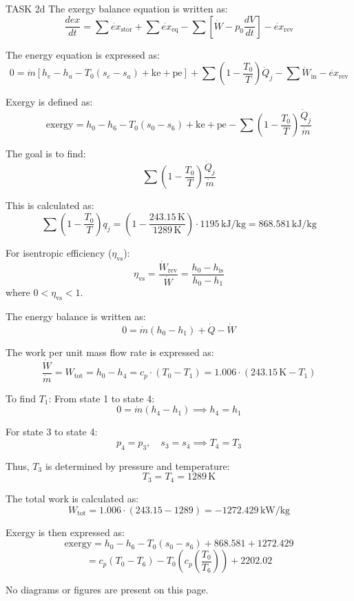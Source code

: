 TASK 2d  
The exergy balance equation is written as:  
\[
\frac{d ex}{dt} = \sum \dot{ex}_{\text{stor}} + \sum \dot{ex}_{\text{eq}} - \sum \left[ \dot{W} - p_0 \frac{dV}{dt} \right] - \dot{ex}_{\text{rev}}
\]  

The energy equation is expressed as:  
\[
0 = \dot{m} \left[ h_e - h_a - T_0 (s_e - s_a) + \text{ke} + \text{pe} \right] + \sum \left( 1 - \frac{T_0}{T} \right) \dot{Q}_j - \sum \dot{W}_{\text{in}} - \dot{ex}_{\text{rev}}
\]  

Exergy is defined as:  
\[
\text{exergy} = h_0 - h_6 - T_0 (s_0 - s_6) + \text{ke} + \text{pe} - \sum \left( 1 - \frac{T_0}{T} \right) \frac{\dot{Q}_j}{\dot{m}}
\]  

The goal is to find:  
\[
\sum \left( 1 - \frac{T_0}{T} \right) \frac{\dot{Q}_j}{\dot{m}}
\]  

This is calculated as:  
\[
\sum \left( 1 - \frac{T_0}{T} \right) q_j = \left( 1 - \frac{243.15 \, \text{K}}{1289 \, \text{K}} \right) \cdot 1195 \, \text{kJ/kg} = 868.581 \, \text{kJ/kg}
\]  

For isentropic efficiency (\( \eta_{\text{vs}} \)):  
\[
\eta_{\text{vs}} = \frac{\dot{W}_{\text{rev}}}{\dot{W}} = \frac{h_0 - h_{\text{is}}}{h_0 - h_1}
\]  
where \( 0 < \eta_{\text{vs}} < 1 \).  

The energy balance is written as:  
\[
0 = \dot{m} (h_0 - h_1) + \dot{Q} - \dot{W}
\]  

The work per unit mass flow rate is expressed as:  
\[
\frac{\dot{W}}{\dot{m}} = W_{\text{tot}} = h_0 - h_4 = c_p \cdot (T_0 - T_1) = 1.006 \cdot (243.15 \, \text{K} - T_1)
\]  

To find \( T_1 \):  
From state 1 to state 4:  
\[
0 = \dot{m} (h_4 - h_1) \implies h_4 = h_1
\]  

For state 3 to state 4:  
\[
p_4 = p_3, \quad s_3 = s_4 \implies T_4 = T_3
\]  

Thus, \( T_3 \) is determined by pressure and temperature:  
\[
T_3 = T_4 = 1289 \, \text{K}
\]  

The total work is calculated as:  
\[
W_{\text{tot}} = 1.006 \cdot (243.15 - 1289) = -1272.429 \, \text{kW/kg}
\]  

Exergy is then expressed as:  
\[
\text{exergy} = h_0 - h_6 - T_0 (s_0 - s_6) + 868.581 + 1272.429
\]  
\[
= c_p (T_0 - T_6) - T_0 \left( c_p \left( \frac{T_0}{T_6} \right) \right) + 2202.02
\]  

No diagrams or figures are present on this page.
